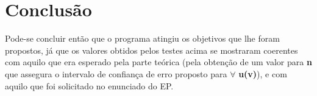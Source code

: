 \documentclass{article}
\begin{document}
\section{Conclusão}

    Pode-se concluir então que o programa atingiu os objetivos que lhe foram propostos, já que os valores obtidos pelos testes acima se mostraram coerentes com aquilo que era esperado pela parte teórica (pela obtenção de um valor para \textbf{n} que assegura o intervalo de confiança de erro proposto para $\forall$ \textbf{u(v)}), e com aquilo que foi solicitado no enunciado do EP.\\
\end{document}

